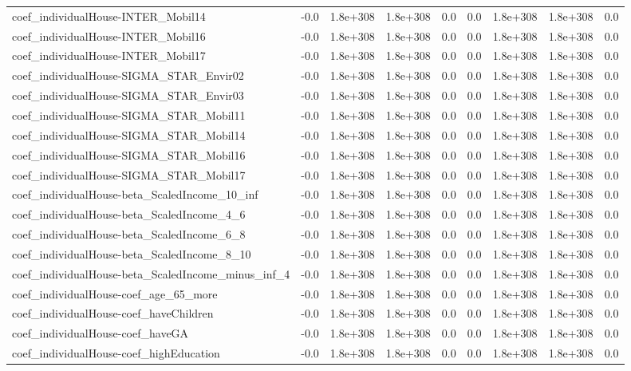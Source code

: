 \begin{tabular}{lrrrrrrrr}
coef_individualHouse-INTER_Mobil14 & -0.0 & 1.8e+308 & 1.8e+308 & 0.0 & 0.0 & 1.8e+308 & 1.8e+308 & 0.0 \\
coef_individualHouse-INTER_Mobil16 & -0.0 & 1.8e+308 & 1.8e+308 & 0.0 & 0.0 & 1.8e+308 & 1.8e+308 & 0.0 \\
coef_individualHouse-INTER_Mobil17 & -0.0 & 1.8e+308 & 1.8e+308 & 0.0 & 0.0 & 1.8e+308 & 1.8e+308 & 0.0 \\
coef_individualHouse-SIGMA_STAR_Envir02 & -0.0 & 1.8e+308 & 1.8e+308 & 0.0 & 0.0 & 1.8e+308 & 1.8e+308 & 0.0 \\
coef_individualHouse-SIGMA_STAR_Envir03 & -0.0 & 1.8e+308 & 1.8e+308 & 0.0 & 0.0 & 1.8e+308 & 1.8e+308 & 0.0 \\
coef_individualHouse-SIGMA_STAR_Mobil11 & -0.0 & 1.8e+308 & 1.8e+308 & 0.0 & 0.0 & 1.8e+308 & 1.8e+308 & 0.0 \\
coef_individualHouse-SIGMA_STAR_Mobil14 & -0.0 & 1.8e+308 & 1.8e+308 & 0.0 & 0.0 & 1.8e+308 & 1.8e+308 & 0.0 \\
coef_individualHouse-SIGMA_STAR_Mobil16 & -0.0 & 1.8e+308 & 1.8e+308 & 0.0 & 0.0 & 1.8e+308 & 1.8e+308 & 0.0 \\
coef_individualHouse-SIGMA_STAR_Mobil17 & -0.0 & 1.8e+308 & 1.8e+308 & 0.0 & 0.0 & 1.8e+308 & 1.8e+308 & 0.0 \\
coef_individualHouse-beta_ScaledIncome_10_inf & -0.0 & 1.8e+308 & 1.8e+308 & 0.0 & 0.0 & 1.8e+308 & 1.8e+308 & 0.0 \\
coef_individualHouse-beta_ScaledIncome_4_6 & -0.0 & 1.8e+308 & 1.8e+308 & 0.0 & 0.0 & 1.8e+308 & 1.8e+308 & 0.0 \\
coef_individualHouse-beta_ScaledIncome_6_8 & -0.0 & 1.8e+308 & 1.8e+308 & 0.0 & 0.0 & 1.8e+308 & 1.8e+308 & 0.0 \\
coef_individualHouse-beta_ScaledIncome_8_10 & -0.0 & 1.8e+308 & 1.8e+308 & 0.0 & 0.0 & 1.8e+308 & 1.8e+308 & 0.0 \\
coef_individualHouse-beta_ScaledIncome_minus_inf_4 & -0.0 & 1.8e+308 & 1.8e+308 & 0.0 & 0.0 & 1.8e+308 & 1.8e+308 & 0.0 \\
coef_individualHouse-coef_age_65_more & -0.0 & 1.8e+308 & 1.8e+308 & 0.0 & 0.0 & 1.8e+308 & 1.8e+308 & 0.0 \\
coef_individualHouse-coef_haveChildren & -0.0 & 1.8e+308 & 1.8e+308 & 0.0 & 0.0 & 1.8e+308 & 1.8e+308 & 0.0 \\
coef_individualHouse-coef_haveGA & -0.0 & 1.8e+308 & 1.8e+308 & 0.0 & 0.0 & 1.8e+308 & 1.8e+308 & 0.0 \\
coef_individualHouse-coef_highEducation & -0.0 & 1.8e+308 & 1.8e+308 & 0.0 & 0.0 & 1.8e+308 & 1.8e+308 & 0.0 \\

\end{tabular}
